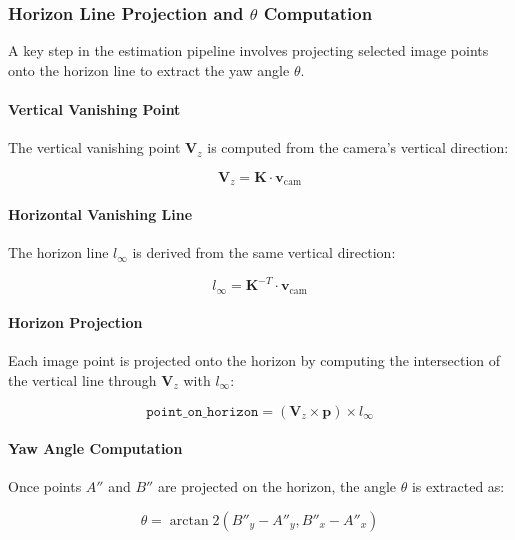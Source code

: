 \subsubsection{Horizon Line Projection and $\theta$ Computation}
A key step in the estimation pipeline involves projecting selected image points onto the horizon line to extract the yaw angle $\theta$.

\paragraph{Vertical Vanishing Point}
The vertical vanishing point $\mathbf{V}_z$ is computed from the camera's vertical direction:

\begin{equation}
    \mathbf{V}_z = \mathbf{K} \cdot \mathbf{v}_{\text{cam}}
\end{equation}

\paragraph{Horizontal Vanishing Line}
The horizon line $l_\infty$ is derived from the same vertical direction:

\begin{equation}
    l_\infty = \mathbf{K}^{-T} \cdot \mathbf{v}_{\text{cam}}
\end{equation}

\paragraph{Horizon Projection}
Each image point is projected onto the horizon by computing the intersection of the vertical line through $\mathbf{V}_z$ with $l_\infty$:

\begin{equation}
    \texttt{point\_on\_horizon} = (\mathbf{V}_z \times \mathbf{p}) \times l_\infty
\end{equation}

\paragraph{Yaw Angle Computation}
Once points $A''$ and $B''$ are projected on the horizon, the angle $\theta$ is extracted as:

\begin{equation}
    \theta = \arctan2( B''_y - A''_y, B''_x - A''_x )
\end{equation}


